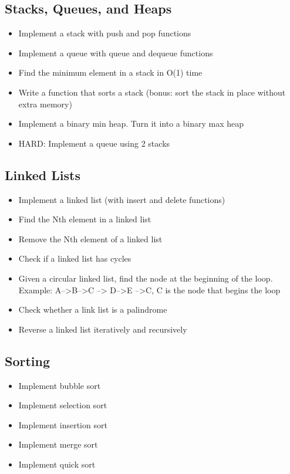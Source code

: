 \subsection{Stacks, Queues, and Heaps}
\begin{itemize}
\item Implement a stack with push and pop functions
\item Implement a queue with queue and dequeue functions
\item Find the minimum element in a stack in O(1) time
\item Write a function that sorts a stack (bonus: sort the stack in place without extra memory)
\item Implement a binary min heap. Turn it into a binary max heap
\item HARD: Implement a queue using 2 stacks
\end{itemize}
\subsection{Linked Lists}
\begin{itemize}
\item Implement a linked list (with insert and delete functions)
\item Find the Nth element in a linked list
\item Remove the Nth element of a linked list
\item Check if a linked list has cycles
\item Given a circular linked list, find the node at the beginning of the loop. Example: A-->B-->C --> D-->E -->C, C is the node that begins the loop
\item Check whether a link list is a palindrome
\item Reverse a linked list iteratively and recursively
\end{itemize}
\subsection{Sorting}
\begin{itemize}
\item Implement bubble sort
\item Implement selection sort
\item Implement insertion sort
\item Implement merge sort
\item Implement quick sort
\end{itemize}

